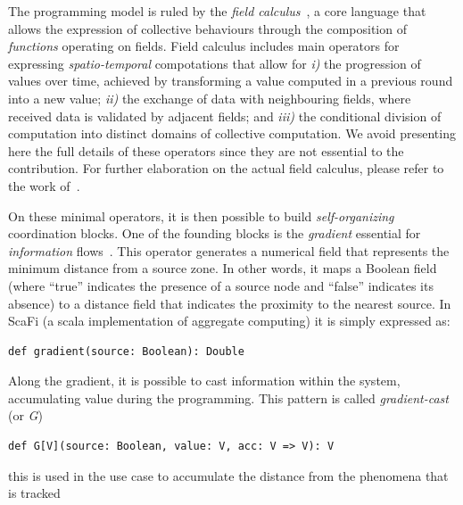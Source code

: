 \documentclass[conference]{IEEEtran}
\begin{document}
The programming model is ruled by the \emph{field calculus}~\cite{DBLP:conf/esocc/ViroliDB13,DBLP:journals/corr/ViroliADPB16,DBLP:journals/tocl/AudritoVDPB19}, 
 a core language that allows the expression of collective behaviours through the composition of \emph{functions} operating on fields.
%
Field calculus includes main operators for expressing \emph{spatio-temporal} compotations that allow for 
\emph{i)} the progression of values over time, achieved by transforming a value computed in a previous round into a new value; 
\emph{ii)} the exchange of data with neighbouring fields, where received data is validated by adjacent fields; and 
\emph{iii)} the conditional division of computation into distinct domains of collective computation. 
%
We avoid presenting here the full details of these operators since they are not essential to the contribution. 
For further elaboration on the actual field calculus, please refer to the work of~\cite{DBLP:journals/jlap/ViroliBDACP19}.

On these minimal operators, 
 it is then possible to build \emph{self-organizing} coordination blocks.
 One of the founding blocks is the \emph{gradient} essential for 
 \emph{information} flows~\cite{DBLP:conf/saso/WolfH07}.
%
This operator generates a numerical field that represents the minimum distance from a source zone. 
%
In other words, it maps a Boolean field (where ``true'' indicates the presence of a source node and ``false'' indicates its absence) to a distance field that indicates the proximity to the nearest source. In ScaFi (a scala implementation of aggregate computing) it is simply expressed as:
\begin{lstlisting}
def gradient(source: Boolean): Double
\end{lstlisting}
Along the gradient, it is possible to cast information within the system, accumulating value during the programming. This pattern is called \emph{gradient-cast} (or \emph{G}) 
\begin{lstlisting}
def G[V](source: Boolean, value: V, acc: V => V): V
\end{lstlisting}
this is used in the use case to accumulate the distance from the phenomena that is tracked
\end{document}
